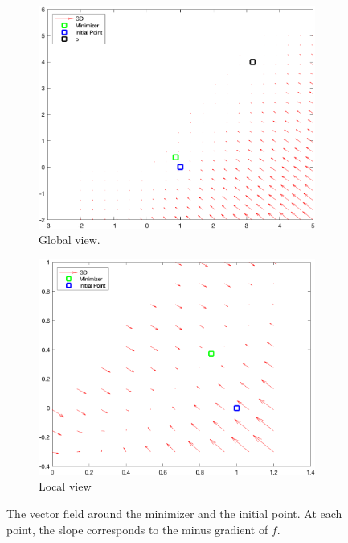 \documentclass{article}
\begin{document}
\begin{figure} 
	\begin{subfigure}[b]{.5\linewidth}
		\centering\large 	\includegraphics[width=\linewidth]{figs/vecfield_global}
		\caption{Global view.}\label{fig: vecfield_global}
	\end{subfigure}%
	\begin{subfigure}[b]{.515\linewidth}
		\centering\large 	\includegraphics[width=\linewidth]{figs/vecfield_veryclose}
		\caption{Local view}\label{fig: vecfield_veryclose}
	\end{subfigure}
	\caption{The vector field around the minimizer and the initial point. At each point, the slope corresponds to the minus gradient of $ f $.}\label{fig: vector field}
\end{figure}
\end{document}
